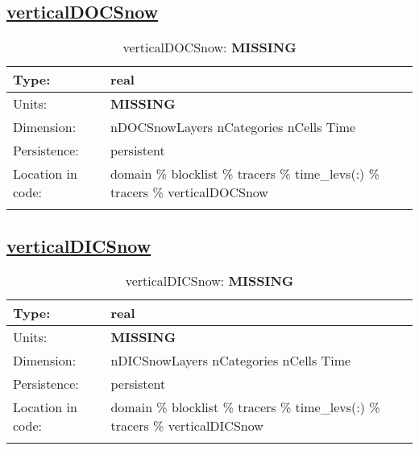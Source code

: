 \subsection[verticalDOCSnow]{\hyperref[sec:var_tab_tracers]{verticalDOCSnow}}
\label{subsec:var_sec_tracers_verticalDOCSnow}
\begin{center}
\begin{longtable}{| p{2.0in} | p{4.0in} |}
        \hline 
        Type: & real \\
        \hline 
        Units: & {\bf \color{red} MISSING} \\
        \hline 
        Dimension: & nDOCSnowLayers nCategories nCells Time \\
        \hline 
        Persistence: & persistent \\
        \hline 
         Location in code: & domain \% blocklist \% tracers \% time\_levs(:) \% tracers \% verticalDOCSnow \\
         \hline 
    \caption{verticalDOCSnow: {\bf \color{red} MISSING}}
\end{longtable}
\end{center}
\subsection[verticalDICSnow]{\hyperref[sec:var_tab_tracers]{verticalDICSnow}}
\label{subsec:var_sec_tracers_verticalDICSnow}
\begin{center}
\begin{longtable}{| p{2.0in} | p{4.0in} |}
        \hline 
        Type: & real \\
        \hline 
        Units: & {\bf \color{red} MISSING} \\
        \hline 
        Dimension: & nDICSnowLayers nCategories nCells Time \\
        \hline 
        Persistence: & persistent \\
        \hline 
         Location in code: & domain \% blocklist \% tracers \% time\_levs(:) \% tracers \% verticalDICSnow \\
         \hline 
    \caption{verticalDICSnow: {\bf \color{red} MISSING}}
\end{longtable}
\end{center}
